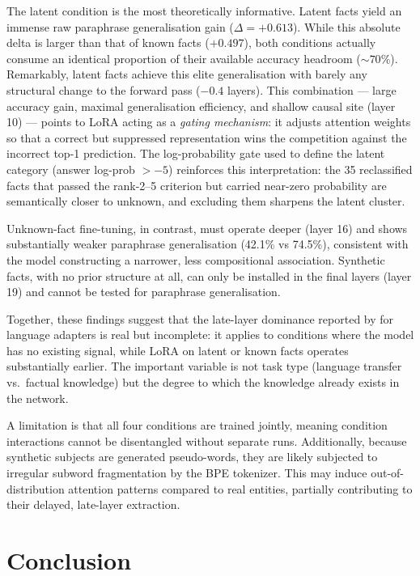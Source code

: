 \documentclass[11pt]{article}
\begin{document}
The latent condition is the most theoretically informative.
Latent facts yield an immense raw paraphrase generalisation gain ($\Delta = +0.613$). While this absolute delta is larger than that of known facts ($+0.497$), both conditions actually consume an identical proportion of their available accuracy headroom ($\sim 70\%$). Remarkably, latent facts achieve this elite generalisation with barely any structural change to the forward pass ($-0.4$ layers).
This combination --- large accuracy gain, maximal generalisation efficiency, and shallow causal site (layer 10) --- points to LoRA acting as a \emph{gating mechanism}: it adjusts attention weights so that a correct but suppressed representation wins the competition against the incorrect top-1 prediction.
The log-probability gate used to define the latent category (answer log-prob $> -5$) reinforces this interpretation: the 35 reclassified facts that passed the rank-2--5 criterion but carried near-zero probability are semantically closer to unknown, and excluding them sharpens the latent cluster.

Unknown-fact fine-tuning, in contrast, must operate deeper (layer 16) and
shows substantially weaker paraphrase generalisation (42.1\% vs 74.5\%),
consistent with the model constructing a narrower, less compositional
association.
Synthetic facts, with no prior structure at all, can only be installed in the
final layers (layer 19) and cannot be tested for paraphrase generalisation.

Together, these findings suggest that the late-layer dominance reported by
\citet{alabi2024hidden} for language adapters is real but incomplete:
it applies to conditions where the model has no existing signal, while LoRA
on latent or known facts operates substantially earlier.
The important variable is not task type (language transfer vs.\ factual
knowledge) but the degree to which the knowledge already exists in the network.

A limitation is that all four conditions are trained jointly, meaning condition interactions cannot be disentangled without separate runs. Additionally, because synthetic subjects are generated pseudo-words, they are likely subjected to irregular subword fragmentation by the BPE tokenizer. This may induce out-of-distribution attention patterns compared to real entities, partially contributing to their delayed, late-layer extraction.

\section{Conclusion}
\end{document}
